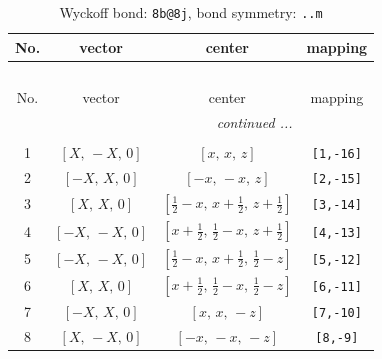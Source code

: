 \documentclass[fleqn,8pt]{jsarticle}
\begin{document}
\begin{longtable}{cccc}
\caption{Wyckoff bond: {\tt 8b@8j}, bond symmetry: {\tt ..m}}
 \\
 \hline \hline
No. & vector & center & mapping \\ \hline \endfirsthead

\multicolumn{3}{l}{\tablename\ \thetable{}} \\
 \hline \hline
No. & vector & center & mapping \\ \hline \endhead

 \hline \hline
\multicolumn{3}{r}{\footnotesize\it continued ...} \\ \endfoot

 \hline \hline
\multicolumn{3}{r}{} \\ \endlastfoot

1 & $\left[ X,\, - X,\, 0 \right]$ & $\left[ x,\, x,\, z \right]$ & {\tt [1,-16]} \\ \hline
2 & $\left[ - X,\, X,\, 0 \right]$ & $\left[ - x,\, - x,\, z \right]$ & {\tt [2,-15]} \\ \hline
3 & $\left[ X,\, X,\, 0 \right]$ & $\left[ \frac{1}{2} - x,\, x + \frac{1}{2},\, z + \frac{1}{2} \right]$ & {\tt [3,-14]} \\ \hline
4 & $\left[ - X,\, - X,\, 0 \right]$ & $\left[ x + \frac{1}{2},\, \frac{1}{2} - x,\, z + \frac{1}{2} \right]$ & {\tt [4,-13]} \\ \hline
5 & $\left[ - X,\, - X,\, 0 \right]$ & $\left[ \frac{1}{2} - x,\, x + \frac{1}{2},\, \frac{1}{2} - z \right]$ & {\tt [5,-12]} \\ \hline
6 & $\left[ X,\, X,\, 0 \right]$ & $\left[ x + \frac{1}{2},\, \frac{1}{2} - x,\, \frac{1}{2} - z \right]$ & {\tt [6,-11]} \\ \hline
7 & $\left[ - X,\, X,\, 0 \right]$ & $\left[ x,\, x,\, - z \right]$ & {\tt [7,-10]} \\ \hline
8 & $\left[ X,\, - X,\, 0 \right]$ & $\left[ - x,\, - x,\, - z \right]$ & {\tt [8,-9]} \\
\end{longtable}
\renewcommand{\arraystretch}{1.2}
\end{document}
